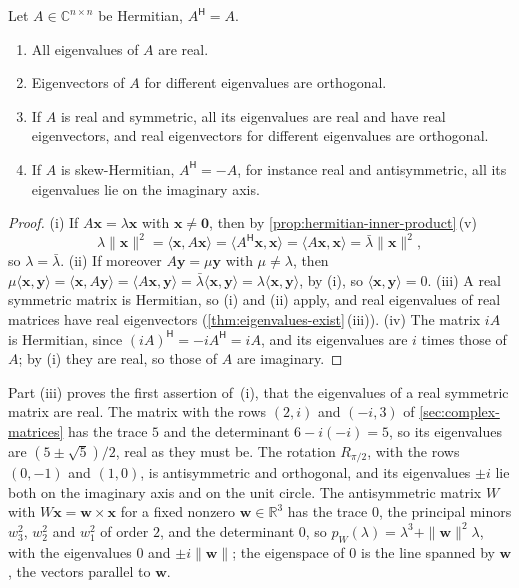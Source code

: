 \begin{proposition}
\label{prop:hermitian-eigen}
Let $A\in\mathbb C^{n\times n}$ be Hermitian, $A^{\mathsf H}=A$.
\begin{enumerate}
\item All eigenvalues of $A$ are real.
\item Eigenvectors of $A$ for different eigenvalues are orthogonal.
\item If $A$ is real and symmetric, all its eigenvalues are real and have real eigenvectors, and real eigenvectors for different eigenvalues are orthogonal.
\item If $A$ is skew-Hermitian, $A^{\mathsf H}=-A$, for instance real and antisymmetric, all its eigenvalues lie on the imaginary axis.
\end{enumerate}
\end{proposition}

\begin{proof}
(i) If $A\mathbf x=\lambda\mathbf x$ with $\mathbf x\ne\mathbf 0$, then by \cref{prop:hermitian-inner-product}\,(v)
\[
\lambda\|\mathbf x\|^2=\langle\mathbf x,A\mathbf x\rangle=\langle A^{\mathsf H}\mathbf x,\mathbf x\rangle=\langle A\mathbf x,\mathbf x\rangle=\bar\lambda\|\mathbf x\|^2 ,
\]
so $\lambda=\bar\lambda$. (ii) If moreover $A\mathbf y=\mu\mathbf y$ with $\mu\ne\lambda$, then $\mu\langle\mathbf x,\mathbf y\rangle=\langle\mathbf x,A\mathbf y\rangle=\langle A\mathbf x,\mathbf y\rangle=\bar\lambda\langle\mathbf x,\mathbf y\rangle=\lambda\langle\mathbf x,\mathbf y\rangle$, by (i), so $\langle\mathbf x,\mathbf y\rangle=0$. (iii) A real symmetric matrix is Hermitian, so (i) and (ii) apply, and real eigenvalues of real matrices have real eigenvectors (\cref{thm:eigenvalues-exist}\,(iii)). (iv) The matrix $iA$ is Hermitian, since $(iA)^{\mathsf H}=-iA^{\mathsf H}=iA$, and its eigenvalues are $i$ times those of $A$; by (i) they are real, so those of $A$ are imaginary.
\end{proof}

Part (iii) proves the first assertion of \,(i), that the eigenvalues of a real symmetric matrix are real. The matrix with the rows $(2,i)$ and $(-i,3)$ of \cref{sec:complex-matrices} has the trace $5$ and the determinant $6-i(-i)=5$, so its eigenvalues are $(5\pm\sqrt5)/2$, real as they must be. The rotation $R_{\pi/2}$, with the rows $(0,-1)$ and $(1,0)$, is antisymmetric and orthogonal, and its eigenvalues $\pm i$ lie both on the imaginary axis and on the unit circle. The antisymmetric matrix $W$ with $W\mathbf x=\mathbf w\times\mathbf x$ for a fixed nonzero $\mathbf w\in\mathbb R^3$ has the trace $0$, the principal minors $w_3^2$, $w_2^2$ and $w_1^2$ of order $2$, and the determinant $0$, so $p_W(\lambda)=\lambda^3+\|\mathbf w\|^2\lambda$, with the eigenvalues $0$ and $\pm i\|\mathbf w\|$; the eigenspace of $0$ is the line spanned by $\mathbf w$, the vectors parallel to $\mathbf w$.

